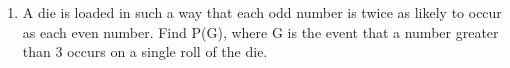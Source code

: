\begin{enumerate}[label=\thesection.\arabic*,ref=\thesection.\theenumi]
	\item A die is loaded in such a way that each odd number is twice as likely to occur as
each even number. Find P(G), where G is the event that a number greater than
3 occurs on a single roll of the die.
		\solution
%		
\end{enumerate}
